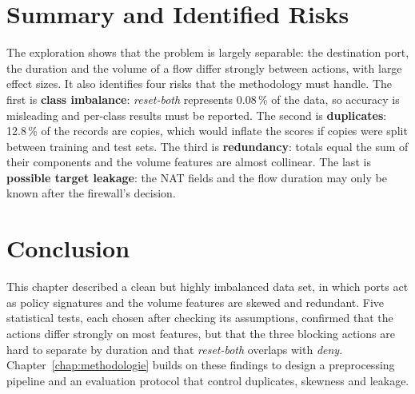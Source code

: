 \section{Summary and Identified Risks}
The exploration shows that the problem is largely separable: the destination port, the duration and the volume of a flow differ strongly between actions, with large effect sizes. It also identifies four risks that the methodology must handle. The first is \textbf{class imbalance}: \emph{reset-both} represents 0.08\,\% of the data, so accuracy is misleading and per-class results must be reported. The second is \textbf{duplicates}: 12.8\,\% of the records are copies, which would inflate the scores if copies were split between training and test sets. The third is \textbf{redundancy}: totals equal the sum of their components and the volume features are almost collinear. The last is \textbf{possible target leakage}: the \ac{NAT} fields and the flow duration may only be known after the firewall's decision.

\section{Conclusion}
This chapter described a clean but highly imbalanced data set, in which ports act as policy signatures and the volume features are skewed and redundant. Five statistical tests, each chosen after checking its assumptions, confirmed that the actions differ strongly on most features, but that the three blocking actions are hard to separate by duration and that \emph{reset-both} overlaps with \emph{deny}. Chapter~\ref{chap:methodologie} builds on these findings to design a preprocessing pipeline and an evaluation protocol that control duplicates, skewness and leakage.

